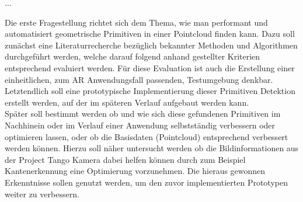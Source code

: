 ...

Die erste Fragestellung richtet sich dem Thema, wie man performant und automatisiert geometrische Primitiven in einer Pointcloud finden kann. Dazu soll zunächst eine Literaturrecherche bezüglich bekannter Methoden und Algorithmen durchgeführt werden, welche darauf folgend anhand gestellter Kriterien entsprechend evaluiert werden. Für diese Evaluation ist auch die Erstellung einer einheitlichen, zum AR Anwendungsfall passenden, Testumgebung denkbar. Letztendlich soll eine prototypische Implementierung dieser Primitiven Detektion erstellt werden, auf der im späteren Verlauf aufgebaut werden kann.\\

Später soll bestimmt werden ob und wie sich diese gefundenen Primitiven im Nachhinein oder im Verlauf einer Anwendung selbstständig verbessern oder optimieren lassen, oder ob die Basisdaten (Pointcloud) entsprechend verbessert werden können. Hierzu soll näher untersucht werden ob die Bildinformationen aus der Project Tango Kamera dabei helfen können durch zum Beispiel Kantenerkennung eine Optimierung vorzunehmen. Die hieraus gewonnen Erkenntnisse sollen genutzt werden, um den zuvor implementierten Prototypen weiter zu verbessern.\\